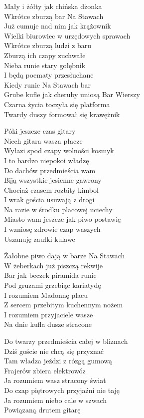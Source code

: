 \begin{text}
Mały i żółty jak chińska dżonka\\
Wkrótce  zburzą bar Na Stawach\\
Już cumuje nad nim jak krążownik\\
Wielki biurowiec w urzędowych sprawach\\
\vin Wkrótce zburzą ludzi z baru\\
\vin Zburzą ich czapy zuchwałe\\
\vin Nieba runie stary gołębnik\\
\vin I będą poematy przesłuchane\\
Kiedy runie Na Stawach bar\\
Grube kufle jak cheruby uniosą Bar Wierszy\\
Czarna życia toczyła się platforma\\
Twardy duszy formował się krawężnik

\vin Póki jeszcze czas gitary\\
\vin Niech gitara wasza płacze\\
\vin Wyłazi spod czapy wolności kosmyk\\
\vin I to bardzo niepokoi władzę\\
\vin Do dachów przedmieścia wam\\
\vin Biją wszystkie jesienne gawrony\\
\vin Chociaż czasem rozbity kimbol\\
\vin I wrak gościa usuwają z drogi\\
\vin Na razie w środku placowej uciechy\\
\vin Miasto wam jeszcze jak piwo postawię\\
\vin I wzniosę zdrowie czap waszych\\
\vin Uszanuję zaułki kulawe

Żałobne piwo dają w barze Na Stawach\\
W żeberkach już piszczą rekwije\\
Bar jak beczek piramida runie\\
Pod gruzami grzebiąc kariatydę\\
\vin I rozumiem Madonnę placu\\
\vin Z sercem przebitym kuchennym nożem\\
\vin I rozumiem przyjaciele wasze\\
\vin Na dnie kufla dusze stracone

Do twarzy przedmieścia całej w bliznach\\
Dziś goście nie chcą się przyznać\\
Tam władza jeździ z rózgą gumową\\
Frajerów zbiera elektrowóz\\
\vin Ja rozumiem wasz stracony świat\\
\vin Do czap piętrowych przyjaźni nie taję\\
\vin Ja rozumiem niebo cale w szwach\\
\vin Powiązaną drutem gitarę
\end{text}
